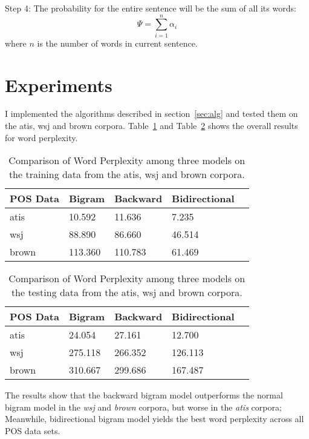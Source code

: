 \documentclass[10pt]{article}
\begin{document}
Step 4: The probability for the entire sentence will be the sum of all its words:
\[
   \Psi = \sum_{i=1}^{n}{ \alpha_{i}}
\]
 where $n$ is the number of words in current sentence.
\section{Experiments}
I implemented the algorithms described in section~\ref{sec:alg} and tested them on the atis, wsj and brown corpora.  Table~\ref{table:train} and Table~\ref{table:test} shows the overall results for word perplexity.

\begin{table}
\begin{center}
\begin{tabular}{|l|l|l|l|l|}  \hline
POS Data    & Bigram & Backward & Bidirectional \\ \hline
atis        & 10.592 & 11.636 & 7.235  \\ \hline
wsj         & 88.890 & 86.660 & 46.514  \\  \hline
brown       & 113.360 & 110.783 & 61.469  \\  \hline
\end{tabular}
\caption{\small Comparison of Word Perplexity among three models on the training data from the atis, wsj and brown corpora.}\label{table:train}
\end{center}
\end{table}

\begin{table}
\begin{center}
\begin{tabular}{|l|l|l|l|l|}  \hline
POS Data    & Bigram & Backward & Bidirectional \\ \hline
atis        & 24.054 & 27.161 & 12.700  \\ \hline
wsj         & 275.118 & 266.352 & 126.113  \\  \hline
brown       & 310.667 & 299.686 & 167.487  \\  \hline
\end{tabular}
\caption{\small Comparison of Word Perplexity among three models on the testing data from the atis, wsj and brown corpora.}\label{table:test}
\end{center}
\end{table}

The results show that the backward bigram model outperforms the normal bigram model in the \emph{wsj} and \emph{brown} corpora, but worse in the \emph{atis} corpora; Meanwhile, bidirectional bigram model yields the best word perplexity across all POS data sets.
\end{document}
